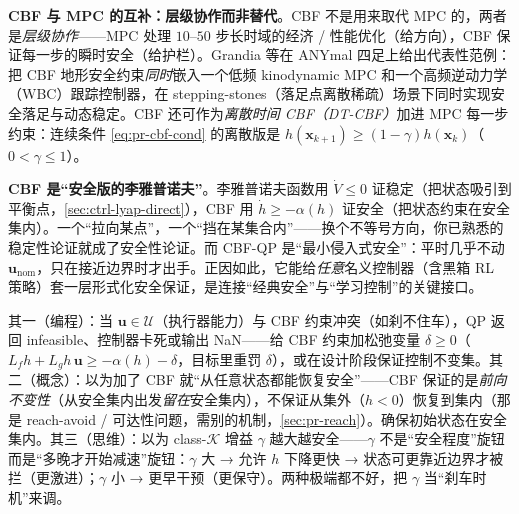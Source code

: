 \textbf{CBF 与 MPC 的互补：层级协作而非替代}。CBF 不是用来取代 MPC 的，两者是\emph{层级协作}——MPC 处理 $10$--$50$ 步长时域的经济 / 性能优化（给方向），CBF 保证每一步的瞬时安全（给护栏）\cite{grandia2021cbf}。Grandia 等\cite{grandia2021cbf}在 ANYmal 四足上给出代表性范例：把 CBF 地形安全约束\emph{同时}嵌入一个低频 kinodynamic MPC 和一个高频逆动力学（WBC）跟踪控制器，在 stepping-stones（落足点离散稀疏）场景下同时实现安全落足与动态稳定。CBF 还可作为\emph{离散时间 CBF（DT-CBF）}加进 MPC 每一步约束：连续条件 \cref{eq:pr-cbf-cond} 的离散版是 $h(\mathbf{x}_{k+1})\ge(1-\gamma)h(\mathbf{x}_k)$（$0<\gamma\le1$）。

\begin{insight}
\textbf{CBF 是“安全版的李雅普诺夫”}。李雅普诺夫函数用 $\dot V\le0$ 证稳定（把状态吸引到平衡点，\cref{sec:ctrl-lyap-direct}），CBF 用 $\dot h\ge-\alpha(h)$ 证安全（把状态约束在安全集内）。一个“拉向某点”，一个“挡在某集合内”——换个不等号方向，你已熟悉的稳定性论证就成了安全性论证。而 CBF-QP 是“最小侵入式安全”：平时几乎不动 $\mathbf{u}_{\mathrm{nom}}$，只在接近边界时才出手。正因如此，它能给\emph{任意}名义控制器（含黑箱 RL 策略）套一层形式化安全保证，是连接“经典安全”与“学习控制”的关键接口。
\end{insight}

\begin{pitfall}
其一（编程）：当 $\mathbf{u}\in\mathcal{U}$（执行器能力）与 CBF 约束冲突（如刹不住车），QP 返回 infeasible、控制器卡死或输出 NaN——给 CBF 约束加松弛变量 $\delta\ge0$（$L_f h+L_g h\,\mathbf{u}\ge-\alpha(h)-\delta$，目标里重罚 $\delta$），或在设计阶段保证控制不变集。其二（概念）：以为加了 CBF 就“从任意状态都能恢复安全”——CBF 保证的是\emph{前向不变性}（从安全集内出发\emph{留在}安全集内），不保证从集外（$h<0$）恢复到集内（那是 reach-avoid / 可达性问题，需别的机制，\cref{sec:pr-reach}）。确保初始状态在安全集内。其三（思维）：以为 class-$\mathcal{K}$ 增益 $\gamma$ 越大越安全——$\gamma$ 不是“安全程度”旋钮而是“多晚才开始减速”旋钮：$\gamma$ 大 → 允许 $h$ 下降更快 → 状态可更靠近边界才被拦（更激进）；$\gamma$ 小 → 更早干预（更保守）。两种极端都不好，把 $\gamma$ 当“刹车时机”来调。
\end{pitfall}

